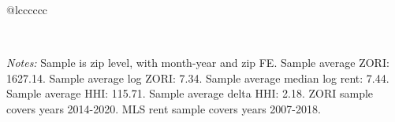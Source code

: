 \begin{table}[H]
{\begin{tabular}{@{\extracolsep{5pt}}lcccccc}
 \hline  

 \hline \\[-1.8ex]  

  {\parbox[t]{\textwidth}{ \textit{Notes:} Sample is zip level, with month-year and zip FE. Sample average ZORI: 1627.14. Sample average log ZORI: 7.34. Sample average median log rent: 7.44. Sample average HHI: 115.71. Sample average delta HHI: 2.18. ZORI sample covers years 2014-2020. MLS rent sample covers years 2007-2018.}} \\ 

 \end{tabular}}  

 \end{table}  

 



